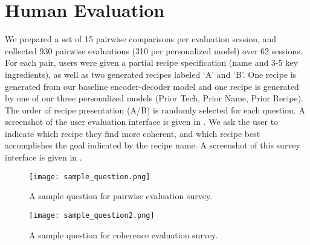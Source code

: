 \documentclass[11pt,a4paper]{article}
\begin{document}
\section*{Human Evaluation}
We prepared a set of 15 pairwise comparisons per evaluation session, and collected 930 pairwise evaluations (310 per personalized model) over 62 sessions.
For each pair, users were given a partial recipe specification (name and 3-5 key ingredients), as well as two generated recipes labeled `A' and `B'.
One recipe is generated from our baseline encoder-decoder model and one recipe is generated by one of our three personalized models (Prior Tech, Prior Name, Prior Recipe).
The order of recipe presentation (A/B) is randomly selected for each question.
A screenshot of the user evaluation interface is given in .
We ask the user to indicate which recipe they find more coherent, and which recipe best accomplishes the goal indicated by the recipe name.
A screenshot of this survey interface is given in .

\begin{figure*}[t]
  \centering
  \texttt{[image: sample\_question.png]}
  \caption{A sample question for pairwise evaluation survey.}
  \label{fig:ex_eval}
\end{figure*}
\begin{figure*}[h!]
  \centering
  \texttt{[image: sample\_question2.png]}
  \caption{A sample question for coherence evaluation survey.}
  \label{fig:ex_eval2}
\end{figure*}
\end{document}
